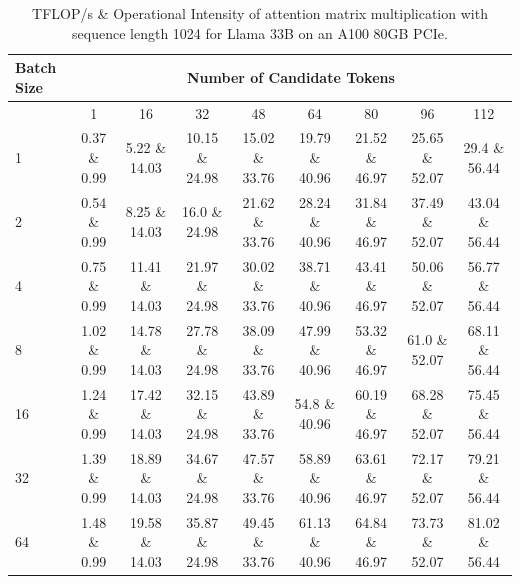 \documentclass{article}
\theoremstyle{plain}
\theoremstyle{definition}
\theoremstyle{remark}
\begin{document}
\begin{table}[h]
\centering
\scriptsize
\begin{tabular}{lcccccccc}
\toprule
Batch Size & \multicolumn{8}{c}{Number of Candidate Tokens} \\
\midrule
 & 1 & 16 & 32 & 48 & 64 & 80 & 96 & 112 \\
\midrule
1  & 0.37 \& 0.99 & 5.22 \& 14.03 & 10.15 \& 24.98 & 15.02 \& 33.76 & 19.79 \& 40.96 & 21.52 \& 46.97 & 25.65 \& 52.07 & 29.4 \& 56.44 \\
2  & 0.54 \& 0.99 & 8.25 \& 14.03 & 16.0 \& 24.98 & 21.62 \& 33.76 & 28.24 \& 40.96 & 31.84 \& 46.97 & 37.49 \& 52.07 & 43.04 \& 56.44 \\
4  & 0.75 \& 0.99 & 11.41 \& 14.03 & 21.97 \& 24.98 & 30.02 \& 33.76 & 38.71 \& 40.96 & 43.41 \& 46.97 & 50.06 \& 52.07 & 56.77 \& 56.44 \\
8  & 1.02 \& 0.99 & 14.78 \& 14.03 & 27.78 \& 24.98 & 38.09 \& 33.76 & 47.99 \& 40.96 & 53.32 \& 46.97 & 61.0 \& 52.07 & 68.11 \& 56.44 \\
16 & 1.24 \& 0.99 & 17.42 \& 14.03 & 32.15 \& 24.98 & 43.89 \& 33.76 & 54.8 \& 40.96 & 60.19 \& 46.97 & 68.28 \& 52.07 & 75.45 \& 56.44 \\
32 & 1.39 \& 0.99 & 18.89 \& 14.03 & 34.67 \& 24.98 & 47.57 \& 33.76 & 58.89 \& 40.96 & 63.61 \& 46.97 & 72.17 \& 52.07 & 79.21 \& 56.44 \\
64 & 1.48 \& 0.99 & 19.58 \& 14.03 & 35.87 \& 24.98 & 49.45 \& 33.76 & 61.13 \& 40.96 & 64.84 \& 46.97 & 73.73 \& 52.07 & 81.02 \& 56.44 \\

\bottomrule
\end{tabular}
\caption{
TFLOP/s \& Operational Intensity of attention matrix multiplication with sequence length 1024 for Llama 33B on an A100 80GB PCIe.}
\label{tab:llama33b-spec-seq1024}
\end{table}
\end{document}
